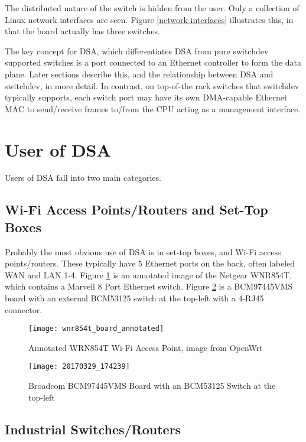 \documentclass[letterpaper]{article}
\begin{document}
The distributed nature of the switch is hidden from the user. Only a
collection of Linux network interfaces are seen. Figure
\ref{network-interfaces} illustrates this, in that the board actually
has three switches.

The key concept for DSA, which differentiates DSA from pure switchdev
supported switches is a port connected to an Ethernet controller to
form the data plane. Later sections describe this, and the
relationship between DSA and switchdev, in more detail. In contrast,
on top-of-the rack switches that switchdev typically supports, each
switch port may have its own DMA-capable Ethernet MAC to send/receive
frames to/from the CPU acting as a management interface.

\section{User of DSA}

Users of DSA fall into two main categories.

\subsection{Wi-Fi Access Points/Routers and Set-Top Boxes}

Probably the most obvious use of DSA is in set-top boxes, and Wi-Fi
access points/routers. These typically have 5 Ethernet ports on the
back, often labeled WAN and LAN 1-4. Figure \ref{wrn854t} is an
annotated image of the Netgear WNR854T, which contains a Marvell 8
Port Ethernet switch. Figure \ref{BCM97445VMS} is a BCM97445VMS board
with an external BCM53125 switch at the top-left with a 4-RJ45
connector.

\begin{figure}[ht]
  \centering
  \texttt{[image: wnr854t\_board\_annotated]}
  \caption{Annotated WRN854T Wi-Fi Access Point, image from OpenWrt}
  \label{wrn854t}
\end{figure}

\begin{figure}[ht]
  \centering
  \texttt{[image: 20170329\_174239]}
  \caption{Broadcom BCM97445VMS Board with an BCM53125 Switch at the top-left}
  \label{BCM97445VMS}
\end{figure}

\subsection{Industrial Switches/Routers}
\end{document}
